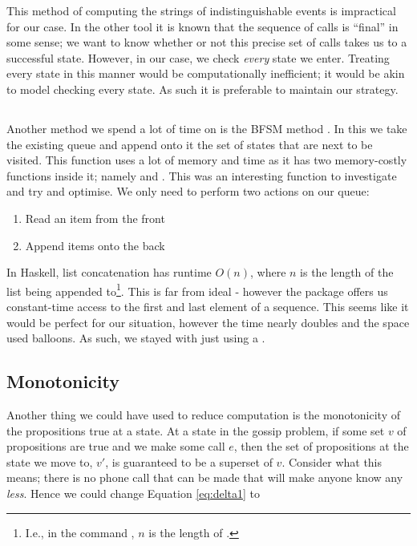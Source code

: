 \documentclass[10pt, a4paper]{report}
\begin{document}
This method of computing the strings of indistinguishable events is impractical
for our case. In the other tool it is known that the sequence of calls is
``final'' in some sense; we want to know whether or not this precise set of
calls takes us to a successful state. However, in our case, we check
\emph{every} state we enter. Treating every state in this manner would be
computationally inefficient; it would be akin to model checking every state. As
such it is preferable to maintain our strategy.  

\subsection{}

Another method we spend a lot of time on is the BFSM method . In
this we take the existing queue and append onto it the set of states that are
next to be visited. This function uses a lot of memory and time as it has two
memory-costly functions inside it; namely  and \mih{(++)}.
This was an interesting function to investigate and try and optimise. We only
need to perform two actions on our queue:

\begin{enumerate}
\item Read an item from the front
\item Append items onto the back
\end{enumerate}

In Haskell, list concatenation has runtime $O(n)$, where $n$ is the length of
the list being appended to\footnote{I.e., in the command , $n$ is
  the length of .}. This is far from ideal - however the 
package offers us constant-time access to the first and last element of a
sequence. This seems like it would be perfect for our situation, however the
time nearly doubles and the space used balloons. As such, we stayed with just
using a .

\subsection{Monotonicity}
\label{sec:Monotonicity}

Another thing we could have used to reduce computation is the monotonicity of
the propositions true at a state. At a state in the gossip problem, if some set
$v$ of propositions are true and we make some call $e$, then the set of
propositions at the state we move to, $v'$, is guaranteed to be a superset of
$v$. Consider what this means; there is no phone call that can be made that will
make anyone know any \emph{less}. Hence we could change Equation
\ref{eq:delta1} to
\end{document}

